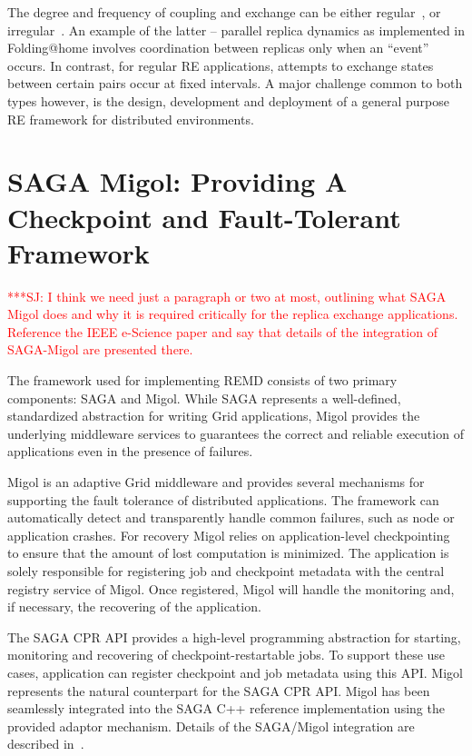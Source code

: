 \documentclass{rspublic}
\newcommand{\jhanote}[1]{ {\textcolor{red} { ***SJ: #1 }}}
\newcommand{\jhanote}[1]{}
\begin{document}
The degree and frequency of coupling and exchange can be either
regular~\citep{hansmann,Sugita:1999rm}, or
irregular~\citep{SPdynamics,pande_bj03}. An example of the latter --
parallel replica dynamics as implemented in Folding@home involves
coordination between replicas only when an ``event'' occurs.  In
contrast, for regular RE applications, attempts to exchange states
between certain pairs occur at fixed intervals. A major challenge
common to both types however, is the design, development and
deployment of a general purpose RE framework for distributed
environments.

\section{SAGA Migol: Providing A Checkpoint and Fault-Tolerant
  Framework}\label{sec:sagamigol}

\jhanote{I think we need just a paragraph or two at most, outlining
  what SAGA Migol does and why it is required critically for the
  replica exchange applications. Reference the IEEE e-Science paper
  and say that details of the integration of SAGA-Migol are presented
  there.}

The framework used for implementing REMD consists of two  primary components: SAGA and Migol.     
While SAGA represents a well-defined, standardized abstraction for writing Grid applications,
Migol provides the underlying middleware services to guarantees the correct and reliable exe\-cution of applications
even in the presence of failures.
    

Migol is an  adaptive Grid middleware and provides several mechanisms for supporting the fault tolerance
of distributed applications. The framework can automatically detect and transparently handle common failures, 
such as node or application crashes. For recovery Migol relies on application-level checkpointing 
to ensure that the amount of lost computation is minimized. The 
application is solely responsible for registering job and checkpoint metadata with the central registry service
of Migol. Once registered, Migol will handle the monitoring and, if necessary, the recovering of the application.

The SAGA CPR API provides a high-level programming abstraction for starting, monitoring and recovering
of checkpoint-restartable jobs. To support these use cases, application can register
checkpoint and job metadata using this API. Migol represents the natural counterpart
for the SAGA CPR API. Migol has been seamlessly integrated into the SAGA C++ reference implementation
using the provided adaptor mechanism. Details of the SAGA/Migol integration are described in~\citet{Luckow:2008la}.
\end{document}
